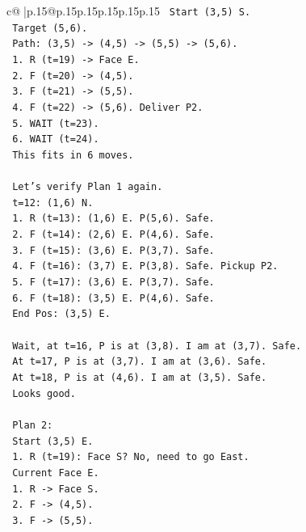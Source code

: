 \documentclass{article}
\begin{document}
{\begin{supertabular}{c@{$\;$}|p{.15\linewidth}@{}p{.15\linewidth}p{.15\linewidth}p{.15\linewidth}p{.15\linewidth}p{.15\linewidth}}
{{{\texttt{   Start (3,5) S.} \\
\texttt{   Target (5,6).} \\
\texttt{   Path: (3,5) {-}> (4,5) {-}> (5,5) {-}> (5,6).} \\
\texttt{   1. R (t=19) {-}> Face E.} \\
\texttt{   2. F (t=20) {-}> (4,5).} \\
\texttt{   3. F (t=21) {-}> (5,5).} \\
\texttt{   4. F (t=22) {-}> (5,6). Deliver P2.} \\
\texttt{   5. WAIT (t=23).} \\
\texttt{   6. WAIT (t=24).} \\
\texttt{   This fits in 6 moves.} \\
\\ 
\texttt{   Let's verify Plan 1 again.} \\
\texttt{   t=12: (1,6) N.} \\
\texttt{   1. R (t=13): (1,6) E. P(5,6). Safe.} \\
\texttt{   2. F (t=14): (2,6) E. P(4,6). Safe.} \\
\texttt{   3. F (t=15): (3,6) E. P(3,7). Safe.} \\
\texttt{   4. F (t=16): (3,7) E. P(3,8). Safe. Pickup P2.} \\
\texttt{   5. F (t=17): (3,6) E. P(3,7). Safe.} \\
\texttt{   6. F (t=18): (3,5) E. P(4,6). Safe.} \\
\texttt{   End Pos: (3,5) E.} \\
\\ 
\texttt{   Wait, at t=16, P is at (3,8). I am at (3,7). Safe.} \\
\texttt{   At t=17, P is at (3,7). I am at (3,6). Safe.} \\
\texttt{   At t=18, P is at (4,6). I am at (3,5). Safe.} \\
\texttt{   Looks good.} \\
\\ 
\texttt{   Plan 2:} \\
\texttt{   Start (3,5) E.} \\
\texttt{   1. R (t=19): Face S? No, need to go East.} \\
\texttt{      Current Face E.} \\
\texttt{      1. R {-}> Face S.} \\
\texttt{      2. F {-}> (4,5).} \\
\texttt{      3. F {-}> (5,5).} \\
}}}
\end{supertabular}}
\end{document}
